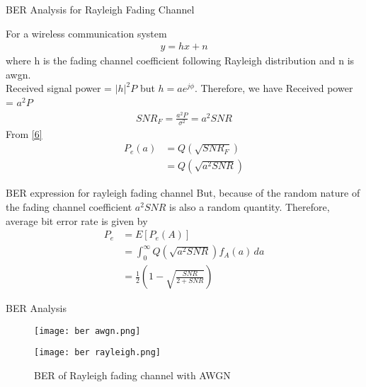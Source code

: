 \documentclass{beamer}
\begin{document}
\begin{frame}{BER Analysis for Rayleigh Fading Channel}
    \begin{block}{}
   For a wireless communication system
   \begin{align}
     y=hx+n  
   \end{align}
   where h is the fading channel coefficient following Rayleigh distribution and n is awgn.\\
   Received signal power = $|h|^2 P$
but $h = ae^{j\phi}$.
 Therefore, we have
Received power = $a^2P$
\begin{align}
    SNR_F =\frac{a^2P}{\sigma^2}= a^2SNR
\end{align}
From \eqref{6}
\begin{align}
   P_e(a)&=Q(\sqrt{SNR_F}) \\
   &=Q(\sqrt{a^2SNR})
\end{align}
    \end{block}
\end{frame}
\begin{frame}{}
\begin{block}{BER expression for rayleigh fading channel}
 But, because of the random nature of the fading channel
coefficient $a^2SNR$ is also a random quantity. Therefore, average bit error rate is given by
 \begin{align}
  P_e&=E[P_e(A)]\\
      &=\int_0^{\infty}Q(\sqrt{a^2SNR})f_A(a) \, da\\
    &=\frac{1}{2}\left(1-\sqrt{\frac{SNR}{2+SNR}}\right)
 \end{align}

  \end{block}
\end{frame}
\begin{frame}{BER Analysis}
 \begin{figure}
\centering
\begin{minipage}{.5\textwidth}
  \centering
  \texttt{[image: ber awgn.png]}
  \caption{BER of AWGN under BPSK modulation}
  \label{fig:test3}
\end{minipage}%
\begin{minipage}{.5\textwidth}
  \centering
  \texttt{[image: ber rayleigh.png]}
  \caption{BER of Rayleigh fading channel with AWGN}
  \label{fig:test4}
\end{minipage}
\end{figure}   
\end{frame}
\end{document}
